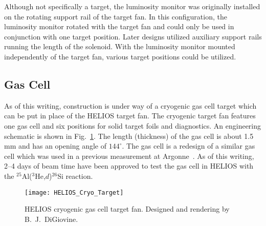 Although not specifically a target, the luminosity monitor was originally installed on the rotating support rail of the target fan.  In this configuration, the luminosity monitor rotated with the target fan and could only be used in conjunction with one target position.  Later designs utilized auxiliary support rails running the length of the solenoid.  With the luminosity monitor mounted independently of the target fan, various target positions could be utilized.

\subsection{Gas Cell}
As of this writing, construction is under way of a cryogenic  gas cell target which can be put in place of the HELIOS target fan.  The cryogenic target fan features one gas cell and six positions for solid target foils and diagnostics.  An engineering schematic is shown in Fig.~\ref{gas_fan}.  The length (thickness) of the gas cell is about 1.5\,mm and has an opening angle of $144^\circ$.  The gas cell is a redesign of a similar gas cell which was used in a previous measurement at Argonne~\cite{Sonzogni_2000}.  As of this writing, 2--4 days of beam time have been approved to test the gas cell in HELIOS with the $^{25}$Al($^3$He,$d$)$^{26}$Si reaction. 

\begin{figure}[hb]%
\centering
\texttt{[image: HELIOS\_Cryo\_Target]}%
\caption[HELIOS cryogenic gas cell target fan]{HELIOS cryogenic gas cell target fan. Designed and rendering by B.~J.\ DiGiovine.}%
\label{gas_fan}%
\end{figure}